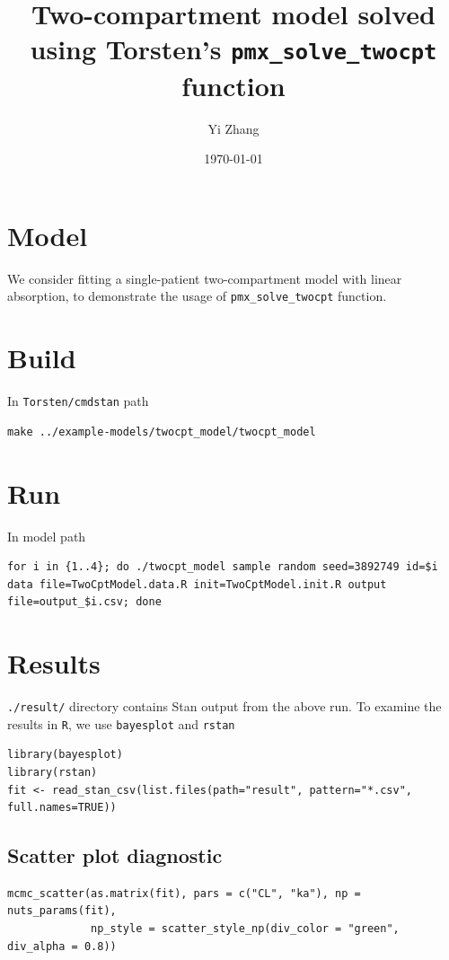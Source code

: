 \documentclass[11pt]{article}
\author{Yi Zhang}
\date{\today}
\title{Two-compartment model solved using Torsten's \texttt{pmx\_solve\_twocpt} function}
\begin{document}
\maketitle
\section{Model}
\label{sec:orge9f17a2}
We consider fitting a single-patient two-compartment model with linear absorption,
to demonstrate the usage of \texttt{pmx\_solve\_twocpt} function.
\section{Build}
\label{sec:org759237b}
In \texttt{Torsten/cmdstan} path
\begin{verbatim}
make ../example-models/twocpt_model/twocpt_model
\end{verbatim}
\section{Run}
\label{sec:org5e9e255}
In model path
\begin{verbatim}
for i in {1..4}; do ./twocpt_model sample random seed=3892749 id=$i data file=TwoCptModel.data.R init=TwoCptModel.init.R output file=output_$i.csv; done
\end{verbatim}
\section{Results}
\label{sec:orgae944e8}
\texttt{./result/} directory contains Stan output from the above
run. To examine the results in \texttt{R}, we use \texttt{bayesplot} and \texttt{rstan}
\begin{verbatim}
library(bayesplot)
library(rstan)
fit <- read_stan_csv(list.files(path="result", pattern="*.csv", full.names=TRUE))
\end{verbatim}

\subsection{Scatter plot diagnostic}
\label{sec:orgf64a0b4}
\begin{verbatim}
mcmc_scatter(as.matrix(fit), pars = c("CL", "ka"), np = nuts_params(fit),
             np_style = scatter_style_np(div_color = "green", div_alpha = 0.8))

\end{verbatim}
\end{document}
